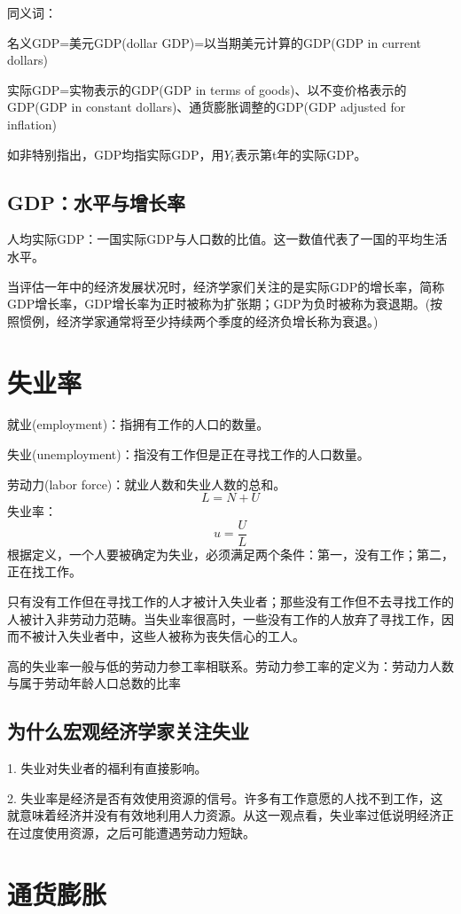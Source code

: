\documentclass{article}
\begin{document}
同义词：

名义GDP=美元GDP(dollar GDP)=以当期美元计算的GDP(GDP in current dollars)

实际GDP=实物表示的GDP(GDP in terms of goods)、以不变价格表示的GDP(GDP in constant dollars)、通货膨胀调整的GDP(GDP adjusted for inflation)

如非特别指出，GDP均指实际GDP，用$ Y_t $表示第t年的实际GDP。

\subsection{GDP：水平与增长率}
人均实际GDP：一国实际GDP与人口数的比值。这一数值代表了一国的平均生活水平。

当评估一年中的经济发展状况时，经济学家们关注的是实际GDP的增长率，简称GDP增长率，GDP增长率为正时被称为扩张期；GDP为负时被称为衰退期。(按照惯例，经济学家通常将至少持续两个季度的经济负增长称为衰退。)

\section{失业率}
就业(employment)：指拥有工作的人口的数量。

失业(unemployment)：指没有工作但是正在寻找工作的人口数量。

劳动力(labor force)：就业人数和失业人数的总和。
\[
L=N+U
\]
失业率：
\[
u=\frac{U}{L}
\]
根据定义，一个人要被确定为失业，必须满足两个条件：第一，没有工作；第二，正在找工作。

只有没有工作但在寻找工作的人才被计入失业者；那些没有工作但不去寻找工作的人被计入非劳动力范畴。当失业率很高时，一些没有工作的人放弃了寻找工作，因而不被计入失业者中，这些人被称为丧失信心的工人。

高的失业率一般与低的劳动力参工率相联系。劳动力参工率的定义为：劳动力人数与属于劳动年龄人口总数的比率


\subsection{为什么宏观经济学家关注失业}
1. 失业对失业者的福利有直接影响。

2. 失业率是经济是否有效使用资源的信号。许多有工作意愿的人找不到工作，这就意味着经济并没有有效地利用人力资源。从这一观点看，失业率过低说明经济正在过度使用资源，之后可能遭遇劳动力短缺。

\section{通货膨胀}
\end{document}
